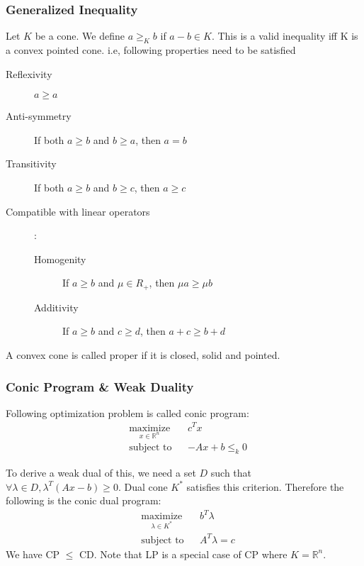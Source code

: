 \documentclass[a4paper,11pt]{article}
\newcommand{\Rn}{\mathbb{R}^n}
\begin{document}
\subsubsection{Generalized Inequality}
Let $K$ be a cone. We define $a \geq_K b$ if $a - b \in K$. This is a valid inequality iff K is a convex pointed cone. i.e, following properties need to be satisfied
\begin{description}
\item[Reflexivity] $a \geq a$
\item[Anti-symmetry] If both $a \geq b$ and $b \geq a$, then $a = b$
\item[Transitivity] If both $a \geq b$ and $b \geq c$, then $a \geq c$
\item[Compatible with linear operators]:
\begin{description}
\item[Homogenity] If $a \geq b$ and $\mu \in R_+$, then $\mu a \geq \mu b$
\item[Additivity] If $a \geq b$ and $c \geq d$, then $ a + c \geq b + d$
\end{description}
\end{description}
A convex cone is called proper if it is closed, solid and pointed. 

\subsubsection{Conic Program \& Weak Duality}
Following optimization problem is called conic program:
\begin{equation}
\begin{aligned}
& \underset{x\in \Rn}{\text{maximize}}
& & c^Tx \\
& \text{subject to}
& & -Ax + b \leq_k 0 
\end{aligned}
\tag{CP}
\end{equation}

To derive a weak dual of this, we need a set $D$ such that $\forall \lambda \in D, \lambda^T(Ax-b)\geq 0$. 
Dual cone $K^*$ satisfies this criterion. Therefore the following is the conic dual program:
\begin{equation}
\begin{aligned}
& \underset{\lambda \in K^*}{\text{maximize}}
& & b^T\lambda \\
& \text{subject to}
& & A^T\lambda = c 
\end{aligned}
\tag{CD}
\end{equation}
We have CP $\leq$ CD. Note that LP is a special case of CP where $K = \Rn$.
\end{document}
